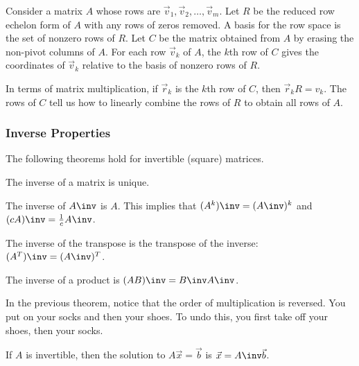 \begin{theorem}\label{thm rowsp basis}
Consider a matrix $A$ whose rows are $\vec v_1,\vec v_2,\ldots,\vec v_m$. Let $R$ be the reduced row echelon form of $A$ with any rows of zeros removed. A basis for the row space is the set of nonzero rows of $R$.  Let $C$ be the matrix obtained from $A$ by erasing the non-pivot columns of $A$. For each row $\vec v_k$ of $A$, the $k$th row of $C$ gives the coordinates of $\vec v_k$ relative to the basis of nonzero rows of $R$.
  
In terms of matrix multiplication, if $\vec r_k$ is the $k$th row of $C$, then $\vec r_k R=v_k$. The rows of $C$ tell us how to linearly combine the rows of $R$ to obtain all rows of $A$.
\end{theorem}





\subsubsection{Inverse Properties}

The following theorems hold for invertible (square) matrices.


\begin{theorem}\label{invunique}
The inverse of a matrix is unique.
\end{theorem}

\begin{theorem} \label{thm inverse of inverse}
The inverse of $A\inv$ is $A$. This implies that $(A^k)\inv=(A\inv)^k$ and $(cA)\inv = \frac{1}{c}A\inv$.
\end{theorem}

\begin{theorem}\label{thm inverse of transpose}
The inverse of the transpose is the transpose of the inverse: $(A^T)\inv = (A\inv)^T$.
\end{theorem}

\begin{theorem}\label{invprod}
The inverse of a product is $(AB)\inv = B\inv A\inv$. 
\end{theorem}

In the previous theorem, notice that the order of multiplication is reversed. You put on your socks and then your shoes. To undo this, you first take off your shoes, then your socks.

\begin{theorem}
If $A$ is invertible, then the solution to $A\vec x=\vec b$ is $\vec x=A\inv \vec b$.
\end{theorem}



